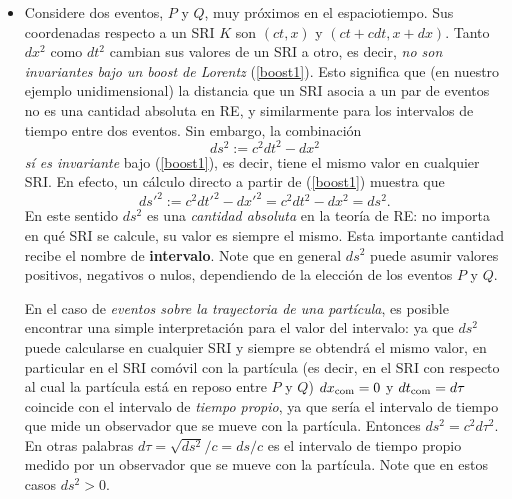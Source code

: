 \begin{itemize}
\item Considere dos eventos, $P$ y $Q$, muy próximos en el espaciotiempo. Sus coordenadas respecto a un SRI $K$ son $(ct,x)$ y $(ct+cdt,x+dx)$. Tanto $dx^2$ como $dt^2$ cambian sus valores de un SRI a otro, es decir,  \textit{no son invariantes bajo un boost de Lorentz} (\ref{boost1}). Esto significa que (en nuestro ejemplo unidimensional) la distancia que un SRI asocia a un par de eventos no es una cantidad absoluta en RE, y similarmente para los intervalos de tiempo entre dos eventos. Sin embargo, la combinación
\begin{equation}
ds^2:=c^2dt^2-dx^2
\end{equation}
\textit{sí es invariante} bajo (\ref{boost1}), es decir, tiene el mismo valor en cualquier SRI. En efecto, un cálculo directo a partir de (\ref{boost1}) muestra que
\begin{equation}
ds'^2:=c^2dt'^2-dx'^2=c^2dt^2-dx^2=ds^2.
\end{equation}
En este sentido $ds^2$ es una \textit{cantidad absoluta} en la teoría de RE: no importa en qué SRI se calcule, su valor es siempre el mismo. Esta importante cantidad recibe el nombre de \textbf{intervalo}. Note que en general $ds^2$ puede asumir valores positivos, negativos o nulos, dependiendo de la elección de los eventos $P$ y $Q$.

En el caso de \textit{eventos sobre la trayectoria de una partícula}, es posible encontrar una simple interpretación para el valor del intervalo: ya que $ds^2$ puede calcularse en cualquier SRI y siempre se obtendrá el mismo valor, en particular en el SRI comóvil con la partícula (es decir, en el SRI con respecto al cual la partícula está en reposo entre $P$ y $Q$) $dx_{\rm com}=0$ y $dt_{\rm com}=d\tau$ coincide con el intervalo de \textit{tiempo propio}, ya que sería el intervalo de tiempo que mide un observador que se mueve con la partícula. Entonces $ds^2=c^2d\tau^2$. En otras palabras $d\tau=\sqrt{ds^2}/c=ds/c$ es el intervalo de tiempo propio medido por un observador que se mueve con la partícula. Note que en estos casos $ds^2>0$.

\end{itemize}




